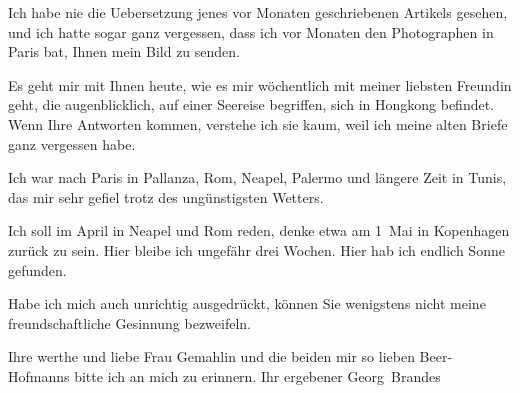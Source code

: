 \pstart
           Ich habe nie die Uebersetzung jenes vor Monaten geschriebenen Artikels gesehen, und ich hatte sogar ganz
               vergessen, dass ich vor Monaten den Photographen in Paris
               bat, Ihnen mein Bild\pwindex{Georg Brandes]@\emph{[Georg Brandes]}|pwv} zu
               senden.\pend
           
\pstart
           Es geht mir mit Ihnen heute, wie es mir wöchentlich mit meiner liebsten Freundin geht, die
               augenblicklich, auf einer Seereise begriffen, sich in Hongkong befindet. Wenn Ihre Antworten kommen, verstehe ich sie
               kaum, weil ich meine alten Briefe ganz vergessen habe.\pend
           
\pstart
           Ich war nach Paris in Pallanza, Rom, Neapel, Palermo und längere Zeit in Tunis, das
               mir sehr gefiel trotz des ungünstigsten Wetters.\pend
           
\pstart
           Ich soll im April in Neapel und Rom reden, denke etwa am 1 Mai in Kopenhagen zurück zu sein. Hier bleibe ich
               ungefähr {\pb}drei Wochen. Hier hab
               ich endlich Sonne gefunden.\pend
           
\pstart
           Habe ich mich auch unrichtig ausgedrückt, können Sie wenigstens nicht meine
               freundschaftliche Gesinnung bezweifeln.\pend
           
\pstart
           Ihre werthe und liebe Frau Gemahlin und die beiden mir so lieben Beer-Hofmanns bitte ich an mich zu erinnern.\pend
           \pstart Ihr ergebener \spacefill\mbox{Georg Brandes}\pend{}\endnumbering{}  
      